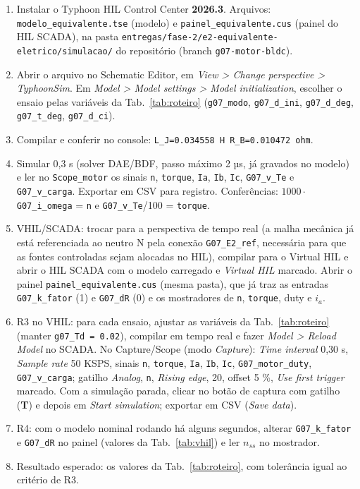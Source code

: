 \documentclass[10pt,a4paper]{article}
\newcommand{\R}[1]{\FloatBarrier\par\medskip\noindent{\large\bfseries #1}\par\smallskip}
\begin{document}
\R{R5. Repetibilidade (roteiro)}
\begin{enumerate}
\item Instalar o Typhoon HIL Control Center \textbf{2026.3}. Arquivos: \texttt{modelo\_equivalente.tse} (modelo) e \texttt{painel\_equivalente.cus} (painel do HIL SCADA), na pasta \texttt{entregas/fase-2/e2-equivalente-eletrico/simulacao/} do repositório (branch \texttt{g07-motor-bldc}).
\item Abrir o arquivo no Schematic Editor, em \emph{View > Change perspective > TyphoonSim}. Em \emph{Model > Model settings > Model initialization}, escolher o ensaio pelas variáveis da Tab.~\ref{tab:roteiro} (\texttt{g07\_modo}, \texttt{g07\_d\_ini}, \texttt{g07\_d\_deg}, \texttt{g07\_t\_deg}, \texttt{g07\_d\_ci}).
\item Compilar e conferir no console: \texttt{L\_J=0.034558 H R\_B=0.010472 ohm}.
\item Simular 0,3 s (solver DAE/BDF, passo máximo 2 µs, já gravados no modelo) e ler no \texttt{Scope\_motor} os sinais \texttt{n}, \texttt{torque}, \texttt{Ia}, \texttt{Ib}, \texttt{Ic}, \texttt{G07\_v\_Te} e \texttt{G07\_v\_carga}. Exportar em CSV para registro. Conferências: $1000\cdot$\texttt{G07\_i\_omega} = \texttt{n} e \texttt{G07\_v\_Te}/100 = \texttt{torque}.
\item VHIL/SCADA: trocar para a perspectiva de tempo real (a malha mecânica já está referenciada ao neutro N pela conexão \texttt{G07\_E2\_ref}, necessária para que as fontes controladas sejam alocadas no HIL), compilar para o Virtual HIL e abrir o HIL SCADA com o modelo carregado e \emph{Virtual HIL} marcado. Abrir o painel \texttt{painel\_equivalente.cus} (mesma pasta), que já traz as entradas \texttt{G07\_k\_fator} (1) e \texttt{G07\_dR} (0) e os mostradores de \texttt{n}, \texttt{torque}, duty e $i_a$.
\item R3 no VHIL: para cada ensaio, ajustar as variáveis da Tab.~\ref{tab:roteiro} (manter \texttt{g07\_Td = 0.02}), compilar em tempo real e fazer \emph{Model > Reload Model} no SCADA. No Capture/Scope (modo \emph{Capture}): \emph{Time interval} 0,30 s, \emph{Sample rate} 50 KSPS, sinais \texttt{n}, \texttt{torque}, \texttt{Ia}, \texttt{Ib}, \texttt{Ic}, \texttt{G07\_motor\_duty}, \texttt{G07\_v\_carga}; gatilho \emph{Analog}, \texttt{n}, \emph{Rising edge}, 20, offset 5 \%, \emph{Use first trigger} marcado. Com a simulação parada, clicar no botão de captura com gatilho (\textbf{T}) e depois em \emph{Start simulation}; exportar em CSV (\emph{Save data}).
\item R4: com o modelo nominal rodando há alguns segundos, alterar \texttt{G07\_k\_fator} e \texttt{G07\_dR} no painel (valores da Tab.~\ref{tab:vhil}) e ler $n_{ss}$ no mostrador.
\item Resultado esperado: os valores da Tab.~\ref{tab:roteiro}, com tolerância igual ao critério de R3.
\end{enumerate}
\end{document}

